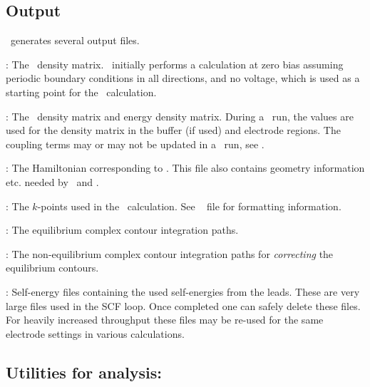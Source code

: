 \subsection{Output}

\tsiesta\ generates several output files.  
\begin{description}
  \itemsep 10pt
  \parsep 0pt
  
  \item[\sysfile{DM}]: The \siesta\ density matrix. \siesta\ initially
  performs a calculation at zero bias assuming periodic boundary conditions in all
  directions, and no voltage, which is used as a starting point for the \tsiesta\
  calculation.
  
  \item[\sysfile{TSDE}]: The \tsiesta\ density matrix and energy
  density matrix. During a \tsiesta\ run, the \sysfile{DM} values are
  used for the density matrix in the buffer (if used) and electrode
  regions. The coupling terms may or may not be updated in a \tsiesta\
  run, see .
  
  \item[\sysfile{TSHS}]: The Hamiltonian corresponding to
  . This file also contains geometry information
  etc. needed by \tsiesta\ and \tbtrans.

  \item[\sysfile{TS.KP}]: The $k$-points used in the \tsiesta\ calculation. See
  \siesta\  file for formatting information.

  \item[\sysfile{TSCCEQ*}]: The equilibrium complex contour integration paths.

  \item[\sysfile{TSCCNEQ*}]: The non-equilibrium complex contour
  integration paths for \emph{correcting} the equilibrium contours.

  \item[\sysfile{TSGF*}]: Self-energy files containing the used
  self-energies from the leads. These are very large files used in the
  SCF loop. Once completed one can safely delete these files.
  For heavily increased throughput these files may be re-used for the
  same electrode settings in various calculations.

\end{description} 

\subsection{Utilities for analysis:
    \texorpdfstring{\tbtrans}{TBtrans}} 
\index{tbtrans@\tbtrans}

